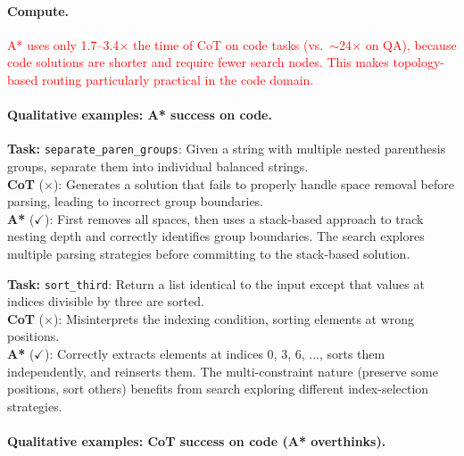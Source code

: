 \documentclass[11pt]{article}
\begin{document}
{{\paragraph{Compute.}
\textcolor{red}{A* uses only 1.7--3.4$\times$ the time of CoT on code tasks (vs.\ $\sim$24$\times$ on QA), because code solutions are shorter and require fewer search nodes. This makes topology-based routing particularly practical in the code domain.}

\paragraph{Qualitative examples: A* success on code.}

\begin{examplebox}[title=HumanEval/1 --- A* Correct{,} CoT Wrong]
\textbf{Task:} \texttt{separate\_paren\_groups}: Given a string with multiple nested parenthesis groups, separate them into individual balanced strings.\\[4pt]
\textbf{CoT} ($\times$): Generates a solution that fails to properly handle space removal before parsing, leading to incorrect group boundaries.\\[4pt]
\textbf{A*} ($\checkmark$): First removes all spaces, then uses a stack-based approach to track nesting depth and correctly identifies group boundaries. The search explores multiple parsing strategies before committing to the stack-based solution.
\end{examplebox}

\begin{examplebox}[title=HumanEval/33 --- A* Correct{,} CoT Wrong]
\textbf{Task:} \texttt{sort\_third}: Return a list identical to the input except that values at indices divisible by three are sorted.\\[4pt]
\textbf{CoT} ($\times$): Misinterprets the indexing condition, sorting elements at wrong positions.\\[4pt]
\textbf{A*} ($\checkmark$): Correctly extracts elements at indices 0, 3, 6, ..., sorts them independently, and reinserts them. The multi-constraint nature (preserve some positions, sort others) benefits from search exploring different index-selection strategies.
\end{examplebox}

\paragraph{Qualitative examples: CoT success on code (A* overthinks).}

}}
\end{document}
